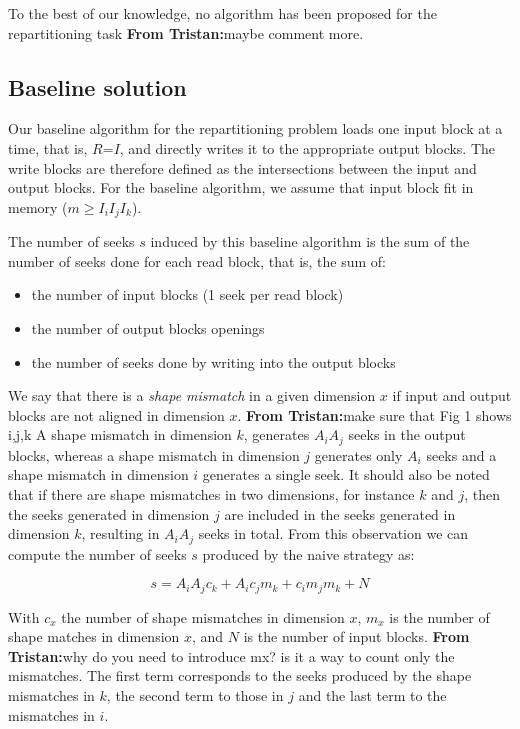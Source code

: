 \documentclass[sigconf, nonacm]{acmart}
\newcommand{\tristan}[1]{\color{orange}\textbf{From Tristan:}#1\color{black}}
\begin{document}
{To the best of our knowledge, no algorithm has been proposed for the
repartitioning task \tristan{maybe comment more}.

\subsection{Baseline solution}

Our baseline algorithm for the repartitioning problem loads one input block
at a time, that is, $R$=$I$,
and directly writes it to the appropriate output blocks.
The write blocks are therefore defined as the intersections between the input
and output blocks.
For the baseline algorithm, we assume that input block fit in memory ($m \geq I_iI_jI_k$).

The number of seeks $s$ induced by this baseline algorithm is the
sum of the number of seeks done for each read block, that is, the sum of:
\begin{itemize}
  \item the number of input blocks (1 seek per read block)
  \item the number of output blocks openings
  \item the number of seeks done by writing into the output blocks
\end{itemize}

We say that there is a \emph{shape mismatch} in a given dimension $x$ if
input and output blocks are not aligned in dimension $x$. \tristan{make sure that Fig 1 shows i,j,k} A shape mismatch
in dimension $k$, generates $A_iA_j$ seeks in the output blocks, whereas a
shape mismatch in dimension $j$ generates only $A_i$ seeks and a shape
mismatch in dimension $i$ generates a single seek. It should also be noted that if
there are shape mismatches in two dimensions, for instance $k$ and $j$,
then the seeks generated in dimension $j$ are included in the seeks generated
in dimension $k$, resulting in $A_iA_j$ seeks in total. From this
observation we can compute the number of seeks $s$ produced by the naive
strategy as:

\begin{equation} \label{eq:1}
s = A_i A_j c_k + A_i c_j m_k + c_i m_j m_k + N
\end{equation}

With $c_x$ the number of shape mismatches in dimension $x$, $m_x$ is the
number of shape matches in dimension $x$, and $N$ is the number of input blocks. \tristan{why do you need to introduce mx? is it a way to count only the mismatches}.
 The first term corresponds to the seeks produced
by the shape mismatches in $k$, the second term to those in $j$ and the last
term to the mismatches in $i$.

}
\end{document}
